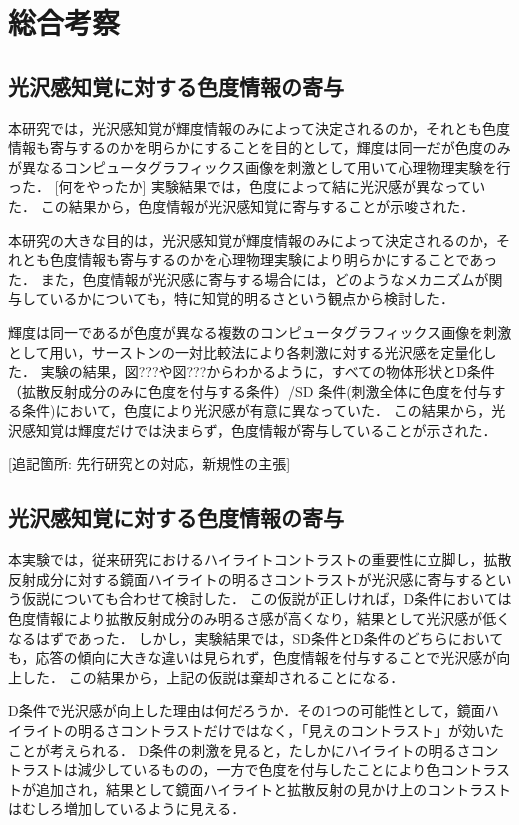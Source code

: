 \chapter{総合考察}
    \section{光沢感知覚に対する色度情報の寄与}
        本研究では，光沢感知覚が輝度情報のみによって決定されるのか，それとも色度情報も寄与するのかを明らかにすることを目的として，輝度は同一だが色度のみが異なるコンピュータグラフィックス画像を刺激として用いて心理物理実験を行った．
        [何をやったか]
        実験結果では，色度によって結に光沢感が異なっていた．
        この結果から，色度情報が光沢感知覚に寄与することが示唆された．

        本研究の大きな目的は，光沢感知覚が輝度情報のみによって決定されるのか，それとも色度情報も寄与するのかを心理物理実験により明らかにすることであった．
        また，色度情報が光沢感に寄与する場合には，どのようなメカニズムが関与しているかについても，特に知覚的明るさという観点から検討した．

        輝度は同一であるが色度が異なる複数のコンピュータグラフィックス画像を刺激として用い，サーストンの一対比較法により各刺激に対する光沢感を定量化した．
        実験の結果，図???や図???からわかるように，すべての物体形状とD条件（拡散反射成分のみに色度を付与する条件）/SD 条件(刺激全体に色度を付与する条件)において，色度により光沢感が有意に異なっていた．
        この結果から，光沢感知覚は輝度だけでは決まらず，色度情報が寄与していることが示された．

        [追記箇所: 先行研究との対応，新規性の主張]

    \section{光沢感知覚に対する色度情報の寄与}
        本実験では，従来研究におけるハイライトコントラストの重要性に立脚し，拡散反射成分に対する鏡面ハイライトの明るさコントラストが光沢感に寄与するという仮説についても合わせて検討した．
        この仮説が正しければ，D条件においては色度情報により拡散反射成分のみ明るさ感が高くなり，結果として光沢感が低くなるはずであった．
        しかし，実験結果では，SD条件とD条件のどちらにおいても，応答の傾向に大きな違いは見られず，色度情報を付与することで光沢感が向上した．
        この結果から，上記の仮説は棄却されることになる．

        D条件で光沢感が向上した理由は何だろうか．その1つの可能性として，鏡面ハイライトの明るさコントラストだけではなく，「見えのコントラスト」が効いたことが考えられる．
        D条件の刺激を見ると，たしかにハイライトの明るさコントラストは減少しているものの，一方で色度を付与したことにより色コントラストが追加され，結果として鏡面ハイライトと拡散反射の見かけ上のコントラストはむしろ増加しているように見える．


